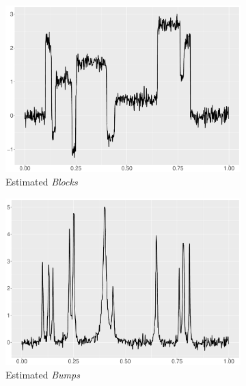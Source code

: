 \begin{figure}
    \centering
    \begin{subfigure}{0.45\textwidth}
    \centering
    \includegraphics[width=\textwidth]{Chapters/02TractorSplineTheory/plot/ggplot/ggBlocksTractorVelocity.pdf}
    \caption{Estimated \textit{Blocks}  }
    \end{subfigure}%
    \begin{subfigure}{0.45\textwidth}
    \centering
    \includegraphics[width=\textwidth]{Chapters/02TractorSplineTheory/plot/ggplot/ggBumpsTractorVelocity.pdf}
    \caption{Estimated \textit{Bumps}  }
    \end{subfigure}
    \begin{subfigure}{0.45\textwidth}
    \centering

\end{subfigure}
\end{figure}

